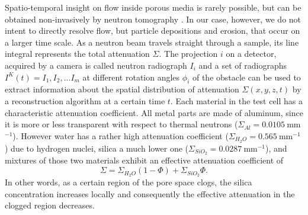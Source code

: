 \documentclass[smallextended]{svjour3}       %
\begin{document}
Spatio-temporal insight on flow inside porous media is rarely possible, but can be obtained non-invasively by neutron tomography \cite{Eyndhoven-etal-2015,Trtik-etal_2016}. In our case, however, we do not intent to directly resolve flow, but particle depositions and erosion, that occur on a larger time scale. As a neutron beam travels straight through a sample, its line integral represents the total attenuation $\Sigma$. The projection $i$ on a detector, acquired by a camera is called neutron radiograph  $I_i$ and a set of radiographs $I^K(t)={I_1,I_2,...I_m}$ at different rotation angles $\phi_i$ of the obstacle can be used to extract information about the spatial distribution of attenuation $\Sigma(x,y,z,t)$ by a reconstruction algorithm at a certain time $t$. Each material in the test cell has a characteristic attenuation coefficient. All metal parts are made of aluminum, since it is more or less transparent with respect to thermal neutrons ($\Sigma_{Al}=0.0105~$mm$^{-1}$). However water has a rather high attenuation coefficient  ($\Sigma_{H_2O}=0.565~$mm$^{-1}$) due to hydrogen nuclei, silica a much lower one ($\Sigma_{SiO_2}=0.0287~$mm$^{-1}$), and mixtures of those two materials exhibit an effective attenuation coefficient of 
\begin{equation}\label{eq:ruleofmix}
\Sigma=\Sigma_{H_2O}(1-\Phi)+\Sigma_{SiO_2}\Phi. 
\end{equation}
In other words, as a certain region of the pore space clogs, the silica concentration increases locally and consequently the effective attenuation in the clogged region decreases.
\end{document}
